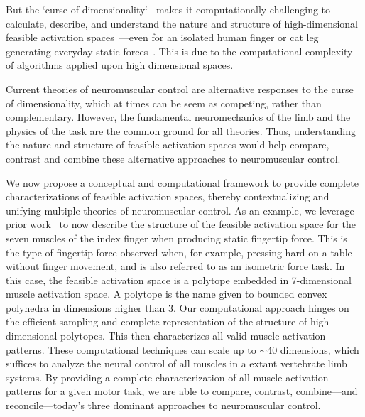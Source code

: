 \documentclass[9pt,twocolumn,twoside,lineno]{pnas-new}
\begin{document}
But the `curse of dimensionality`~\cite{bellman1958dynamic,bellman2015adaptive,avis1992Pivoting} makes it computationally challenging to calculate, describe, and understand the nature and structure of high-dimensional feasible activation spaces~\cite{valero2009computational,Chao1978Graphical,spoor1983balancing,Kuo1993Human,theodorou2010optimalityEMBC,scholz1999uncontrolled,dingwell2010walkingvariability}—even for an isolated human finger or cat leg generating everyday static forces~\cite{kutch2012challenges,Valero-Cuevas2015high-dimensional,valero-cuevas2015fundamentals,sohn2013cat_bounding_box}. This is due to the computational complexity of algorithms applied upon high dimensional spaces.

Current theories of neuromuscular control are alternative responses to the curse of dimensionality, which at times can be seem as competing, rather than complementary. However, the fundamental neuromechanics of the limb and the physics of the task are the common ground for all theories. Thus, understanding the nature and structure of feasible activation spaces would help compare, contrast and combine these alternative approaches to neuromuscular control.

We now propose a conceptual and computational framework to provide complete characterizations of feasible activation spaces, thereby contextualizing and unifying multiple theories of neuromuscular control.
As an example, we leverage prior work~\cite{Valero-Cuevas1998Large,kutch2012challenges,Venkadesan2008Neural} to now describe the structure of the feasible activation space for the seven muscles of the index finger when producing static fingertip force. This is the type of fingertip force observed when, for example, pressing hard on a table without finger movement, and is also referred to as an isometric force task.
In this case, the feasible activation space is a polytope embedded in 7-dimensional muscle activation space. A polytope is the name given to bounded convex polyhedra in dimensions higher than 3. Our computational approach hinges on the efficient sampling and complete representation of the structure of high-dimensional polytopes.
This then characterizes all valid muscle activation patterns.
These computational techniques can scale up to $\sim$40 dimensions, which suffices to analyze the neural control of all muscles in a extant vertebrate limb systems.
By providing a complete characterization of all muscle activation patterns for a given motor task, we are able to compare, contrast, combine---and reconcile---today's three dominant approaches to neuromuscular control.
\end{document}
